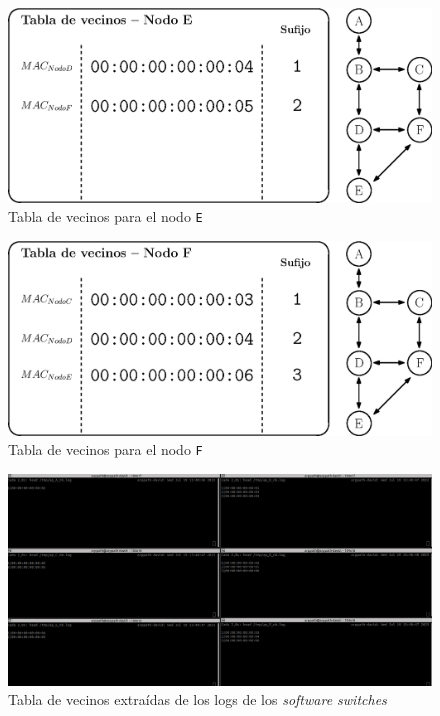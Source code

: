 \begin{figure}[ht!]
    \centering
    \includegraphics[width=\textwidth]{archivos/img/dev/topo_hello_nodoE_nb.eps}
    \caption{Tabla de vecinos para el nodo \texttt{E}}
    \label{fig:topo_hello_nodoE_nb}
\end{figure}


\begin{figure}[ht!]
    \centering
    \includegraphics[width=\textwidth]{archivos/img/dev/topo_hello_nodoF_nb.eps}
    \caption{Tabla de vecinos para el nodo \texttt{F}}
    \label{fig:topo_hello_nodoF_nb}
\end{figure}

\begin{figure}[ht!]
    \centering
    \includegraphics[width=\textwidth]{archivos/img/dev/nb_real.png}
    \caption{Tabla de vecinos extraídas de los logs de los \textit{software switches}}
    \label{fig:nb_real}
\end{figure}


